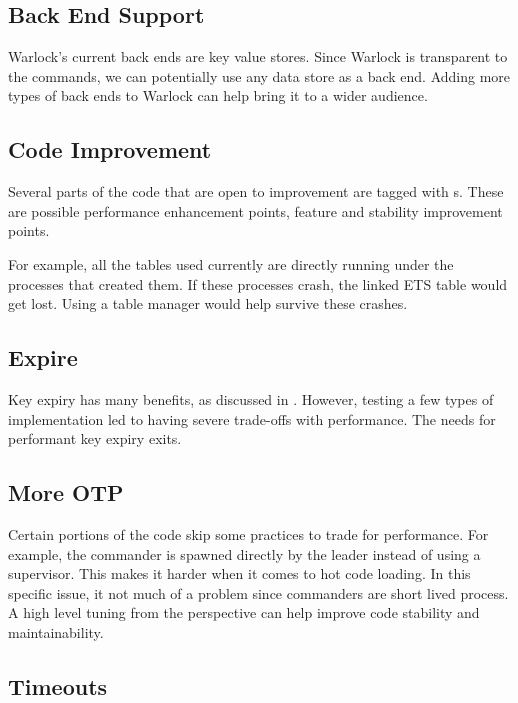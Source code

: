 \subsection{Back End Support}

Warlock's current back ends are key value stores. Since Warlock is transparent
to the commands, we can potentially use any data store as a back end. Adding
more types of back ends to Warlock can help bring it to a wider audience.

\subsection{Code Improvement}

Several parts of the code that are open to improvement are tagged with 
s. These are possible performance enhancement points, feature and
stability improvement points. 

For example, all the  tables used currently
are directly running under the processes that created them. If these processes
crash, the linked ETS table would get lost. Using a table manager would
help survive these crashes.

\subsection{Expire}

Key expiry has many benefits, as discussed in . 
However, testing a few types of implementation led to having severe trade-offs
with performance. The needs for performant key expiry exits.

\subsection{More OTP}

Certain portions of the code skip some  practices to trade for
performance.
For example, the commander is spawned directly by the leader instead of using
a supervisor. This makes it harder when it comes to hot code loading. In this
specific issue, it not much of a problem since commanders are short lived
process. A high level tuning from the  perspective can help improve
code stability and maintainability.

\subsection{Timeouts}

